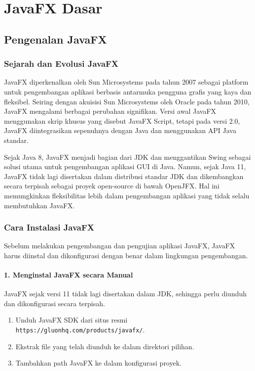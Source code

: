 \chapter{JavaFX Dasar}

\section{Pengenalan JavaFX}

\subsection{Sejarah dan Evolusi JavaFX}

JavaFX diperkenalkan oleh Sun Microsystems pada tahun 2007 sebagai platform untuk pengembangan aplikasi berbasis antarmuka pengguna grafis yang kaya dan fleksibel. Seiring dengan akuisisi Sun Microsystems oleh Oracle pada tahun 2010, JavaFX mengalami berbagai perubahan signifikan. Versi awal JavaFX menggunakan skrip khusus yang disebut JavaFX Script, tetapi pada versi 2.0, JavaFX diintegrasikan sepenuhnya dengan Java dan menggunakan API Java standar.

Sejak Java 8, JavaFX menjadi bagian dari JDK dan menggantikan Swing sebagai solusi utama untuk pengembangan aplikasi GUI di Java. Namun, sejak Java 11, JavaFX tidak lagi disertakan dalam distribusi standar JDK dan dikembangkan secara terpisah sebagai proyek open-source di bawah OpenJFX. Hal ini memungkinkan fleksibilitas lebih dalam pengembangan aplikasi yang tidak selalu membutuhkan JavaFX.

\subsection{Cara Instalasi JavaFX}

Sebelum melakukan pengembangan dan pengujian aplikasi JavaFX, JavaFX harus diinstal dan dikonfigurasi dengan benar dalam lingkungan pengembangan.

\subsubsection{1. Menginstal JavaFX secara Manual}

JavaFX sejak versi 11 tidak lagi disertakan dalam JDK, sehingga perlu diunduh dan dikonfigurasi secara terpisah.

\begin{enumerate}
\item Unduh JavaFX SDK dari situs resmi \texttt{https://gluonhq.com/products/javafx/}.
\item Ekstrak file yang telah diunduh ke dalam direktori pilihan.
\item Tambahkan path JavaFX ke dalam konfigurasi proyek.
\end{enumerate}


